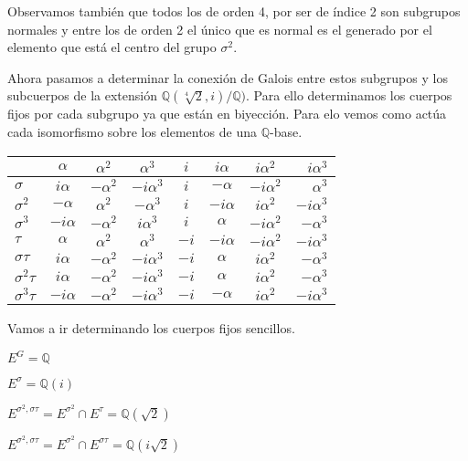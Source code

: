 \begin{enumerate}
Observamos también que todos los de orden 4, por ser de índice 2 son subgrupos normales y entre los de orden 2 el único que es normal es el generado por el elemento que está el centro del grupo $\sigma^2$. 

Ahora pasamos a determinar la conexión de Galois entre estos subgrupos y los subcuerpos de la extensión $\mathbb{Q}(\sqrt[4]{2},i)/\mathbb{Q})$. Para ello determinamos los cuerpos fijos por cada subgrupo ya que están en biyección. Para elo vemos como actúa cada isomorfismo sobre los elementos de una $\mathbb{Q}$-base.

\begin{center}
  \begin{tabular}{ l | c | c | c | c | c | c | r }
    \hline
    &  $\alpha$ & $\alpha^2$ & $\alpha^3$ & $i$ & $i\alpha$ & $i\alpha^2$ & $i\alpha^3$ \\ \hline
    $\sigma$ & $i\alpha$ & $-\alpha^2$ & $-i\alpha^3$ & $i$ & $-\alpha$ & $-i\alpha^2$ & $\alpha^3$ \\ \hline 
    $\sigma^2$ & $-\alpha$ & $\alpha^2$ & $-\alpha^3$ & $i$ & $-i\alpha$ & $i\alpha^2$ & $-i\alpha^3$ \\ \hline
    $\sigma^3$ & $-i\alpha$ & $-\alpha^2$ & $i\alpha^3$ & $i$ & $\alpha$ & $-i\alpha^2$&  $-\alpha^3$ \\ \hline
    $\tau$ & $\alpha$ & $\alpha^2$ & $\alpha^3$ & $-i$ & $-i\alpha$ & $-i\alpha^2$ & $-i\alpha^3$ \\ \hline
    $\sigma \tau$ & $i\alpha$ & $-\alpha^2$ & $-i\alpha^3$ &  $-i$ & $\alpha$ & $i\alpha^2$ & $-\alpha^3$ \\ \hline
    $\sigma^2\tau$  & $i\alpha$ & $-\alpha^2$ & $-i\alpha^3$ & $-i$ & $\alpha$ & $i\alpha^2$ & $-\alpha^3$ \\ \hline
    $\sigma^3\tau$  & $-i\alpha$ & $-\alpha^2$ & $-i\alpha^3$ & $-i$ & $-\alpha$ & $i\alpha^2$ & $-i\alpha^3$ \\ 
    \hline
  \end{tabular}
\end{center}

Vamos a ir determinando los cuerpos fijos sencillos.

$E^G = \mathbb{Q}$

$E^{\sigma} = \mathbb{Q}(i)$

$E^{\sigma^2,\sigma\tau} = E^{\sigma^2} \cap E^{\tau} = \mathbb{Q}(\sqrt{2})$

$E^{\sigma^2,\sigma\tau} = E^{\sigma^2} \cap E^{\sigma\tau} = \mathbb{Q}(i\sqrt{2})$


\end{enumerate}

